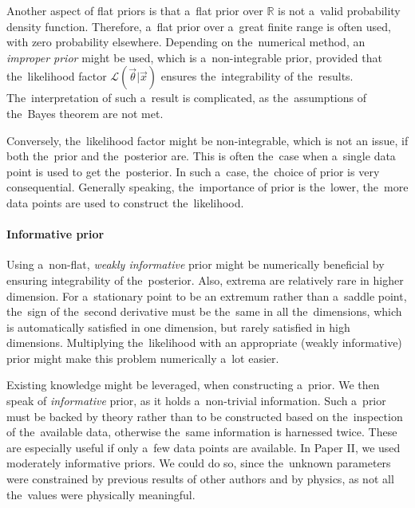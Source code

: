 Another aspect of flat priors is that a~flat prior over $\mathbb{R}$ is not a~valid probability density function. Therefore, a~flat prior over a~great finite range is often used, with zero probability elsewhere. Depending on the~numerical method, an \textit{improper prior} might be used, which is a~non-integrable prior, provided that the~likelihood factor $\mathcal{L}(\vec{\theta}|\vec{x})$ ensures the~integrability of the~results. The~interpretation of such a~result is complicated, as the~assumptions of the~Bayes theorem are not met. 

Conversely, the~likelihood factor might be non-integrable, which is not an issue, if both the~prior and the~posterior are. This is often the~case when a~single data point is used to get the~posterior. In such a~case, the~choice of prior is very consequential. Generally speaking, the~importance of prior is the~lower, the~more data points are used to construct the~likelihood.

\paragraph{Informative prior} Using a~non-flat, \textit{weakly informative} prior might be numerically beneficial by ensuring integrability of the~posterior. Also, extrema are relatively rare in higher dimension. For a~stationary point to be an extremum rather than a~saddle point, the~sign of the~second derivative must be the~same in all the~dimensions, which is automatically satisfied in one dimension, but rarely satisfied in high dimensions. Multiplying the~likelihood with an appropriate (weakly informative) prior might make this problem numerically a~lot easier. 

Existing knowledge might be leveraged, when constructing a~prior. We then speak of \textit{informative} prior, as it holds a~non-trivial information. Such a~prior must be backed by theory rather than to be constructed based on the~inspection of the~available data, otherwise the~same information is harnessed twice. These are especially useful if only a~few data points are available. In Paper II, we used moderately informative priors. We could do so, since the~unknown parameters were constrained by previous results of other authors and by physics, as not all the~values were physically meaningful. 







